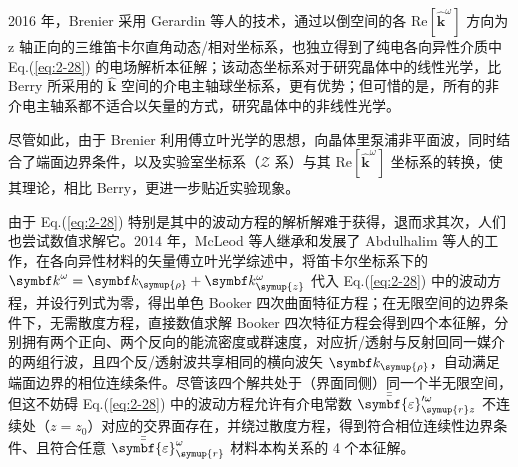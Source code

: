 2016 年，Brenier 采用 Gerardin 等人的技术\cite{gerardinConditionsVoigtWave2001}，通过以倒空间的各 $\mathup{Re} \left[ \hat{\symbf k}^\omega \right]$ 方向为 z 轴正向的三维笛卡尔直角动态/相对坐标系，也独立得到了纯电各向异性介质中 Eq.(\ref{eq:2-28}) 的电场解析本征解\cite{brenierLasingConicalDiffraction2016}；该动态坐标系对于研究晶体中的线性光学，比 Berry 所采用的 $\hat{\symbf k}$ 空间的介电主轴球坐标系，更有优势；但可惜的是，所有的非介电主轴系都不适合以矢量的方式，研究晶体中的非线性光学。

尽管如此，由于 Brenier 利用傅立叶光学的思想，向晶体里泵浦非平面波，同时结合了端面边界条件，以及实验室坐标系（$\mathcal{Z}$ 系）与其 $\mathup{Re} \left[ \hat{\symbf k}^\omega \right]$ 坐标系的转换，使其理论，相比 Berry，更进一步贴近实验现象。

由于 Eq.(\ref{eq:2-28}) 特别是其中的波动方程的解析解难于获得，退而求其次，人们也尝试数值求解它。2014 年，McLeod 等人继承和发展了 Abdulhalim 等人的工作，在各向异性材料的矢量傅立叶光学综述中，将笛卡尔坐标系下的 ${\symbf k}^\omega = \symbf k_{\symup{\rho}} + \symbf k^\omega_{\symup{z}}$ 代入 Eq.(\ref{eq:2-28}) 中的波动方程，并设行列式为零，得出单色 Booker 四次曲面特征方程\cite{mcleodVectorFourierOptics2014}；在无限空间的边界条件下，无需散度方程，直接数值求解 Booker 四次特征方程会得到四个本征解，分别拥有两个正向、两个反向的能流密度或群速度，对应折/透射与反射回同一媒介的两组行波，且四个反/透射波共享相同的横向波矢 $\symbf k_{\symup{\rho}}$，自动满足端面边界的相位连续条件。尽管该四个解共处于（界面同侧）同一个半无限空间，但这不妨碍 Eq.(\ref{eq:2-28}) 中的波动方程允许有介电常数 $\bar{\bar{\symbf{\varepsilon}}}_{\symup{r}z}^{\prime\omega}$ 不连续处（$z = z_0$）对应的交界面存在\cite{chenWavevectorspaceMethodWave1993,nelsonDerivingTransmissionReflection1995}，并绕过散度方程，得到符合相位连续性边界条件、且符合任意 $\bar{\bar{\symbf{\varepsilon}}}_{\symup{r}}^{\omega}$ 材料本构关系的 4 个本征解。

